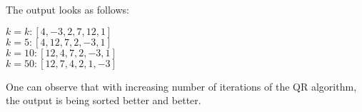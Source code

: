 The output looks as follows:

$k=k:  [ 4, -3,  2,  7, 12,  1]$ \\
$k=5:  [ 4, 12,  7,  2, -3,  1]$ \\
$k=10: [12,  4,  7,  2, -3,  1]$ \\
$k=50: [12,  7,  4,  2,  1, -3]$

One can observe that with increasing number of iterations of the QR algorithm, the output is being sorted better and better.

\color{black}


